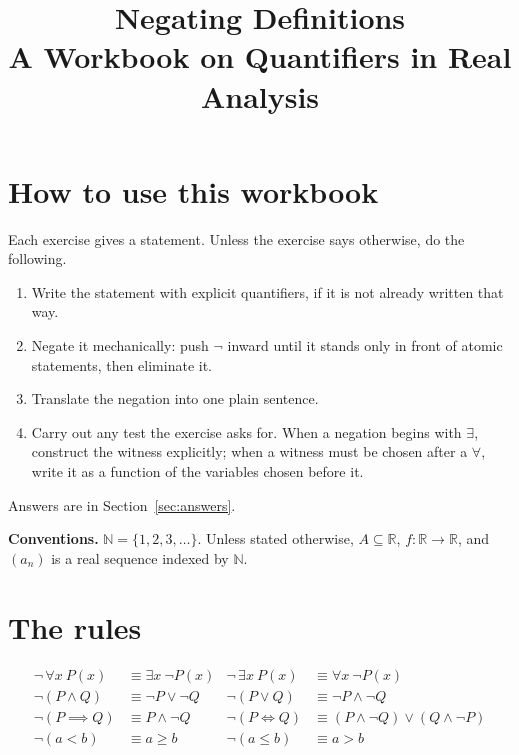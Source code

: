 \documentclass{workbook}
\title{Negating Definitions\\[0.3em]\large A Workbook on Quantifiers in Real Analysis}
\author{}
\date{}
\theoremstyle{definition}
\newcommand{\N}{\mathbb{N}}
\newcommand{\R}{\mathbb{R}}
\begin{document}
\maketitle

\section{How to use this workbook}

Each exercise gives a statement. Unless the exercise says otherwise, do the following.
\begin{enumerate}
  \item Write the statement with explicit quantifiers, if it is not already written that way.
  \item Negate it mechanically: push $\neg$ inward until it stands only in front of atomic statements, then eliminate it.
  \item Translate the negation into one plain sentence.
  \item Carry out any test the exercise asks for. When a negation begins with $\exists$, construct the witness explicitly; when a witness must be chosen after a $\forall$, write it as a function of the variables chosen before it.
\end{enumerate}
Answers are in Section~\ref{sec:answers}.

\textbf{Conventions.} $\N = \{1, 2, 3, \dots\}$. Unless stated otherwise, $A \subseteq \R$, $f \colon \R \to \R$, and $(a_n)$ is a real sequence indexed by $\N$.

\section{The rules}

\begin{align*}
  \neg\, \forall x\ P(x) &\equiv \exists x\ \neg P(x) &
  \neg\, \exists x\ P(x) &\equiv \forall x\ \neg P(x) \\
  \neg (P \land Q) &\equiv \neg P \lor \neg Q &
  \neg (P \lor Q) &\equiv \neg P \land \neg Q \\
  \neg (P \implies Q) &\equiv P \land \neg Q &
  \neg (P \iff Q) &\equiv (P \land \neg Q) \lor (Q \land \neg P) \\
  \neg (a < b) &\equiv a \ge b &
  \neg (a \le b) &\equiv a > b
\end{align*}
\end{document}
